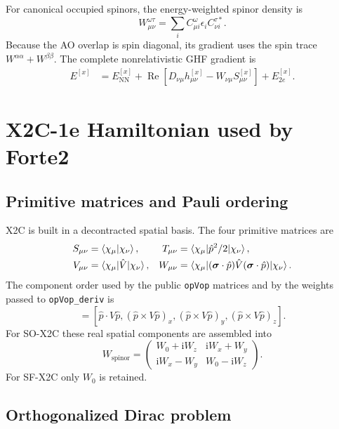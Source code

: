 \documentclass[aip,jcp,preprint]{revtex4-1}
\newcommand{\RePart}{\operatorname{Re}}
\newcommand{\ii}{\mathrm{i}}
\newcommand{\xcoord}{{[x]}}
\begin{document}
For canonical occupied spinors, the energy-weighted spinor density is
\begin{equation}
 W_{\mu\nu}^{\omega\tau}
 =\sum_i C^\omega_{\mu i}\epsilon_i C^{\tau *}_{\nu i}.
\end{equation}
Because the AO overlap is spin diagonal, its gradient uses the spin trace
$W^{\alpha\alpha}+W^{\beta\beta}$.  The complete nonrelativistic GHF gradient
is
\begin{align}
 E^\xcoord
 &=E_\mathrm{NN}^\xcoord
 +\RePart\left[D_{\nu\mu}h^\xcoord_{\mu\nu}
 -W_{\nu\mu}S^\xcoord_{\mu\nu}\right]
 +E^{\xcoord}_{2e}.
 \label{eq:ghf_total_gradient}
\end{align}

\section{X2C-1e Hamiltonian used by Forte2}

\subsection{Primitive matrices and Pauli ordering}

X2C is built in a decontracted spatial basis.  The four primitive matrices are
\begin{align}
 S_{\mu\nu}&=\braket{\chi_\mu|\chi_\nu}, &
 T_{\mu\nu}&=\braket{\chi_\mu|\hat p^2/2|\chi_\nu},\\
 V_{\mu\nu}&=\braket{\chi_\mu|\hat V|\chi_\nu}, &
 W_{\mu\nu}&=\braket{\chi_\mu|(\boldsymbol\sigma\cdot\hat{p})
 \hat V(\boldsymbol\sigma\cdot\hat{p})|\chi_\nu}.
\end{align}
The component order used by the public \texttt{opVop} matrices and by the
weights passed to \texttt{opVop\_deriv} is
\begin{equation}
 [W_0,W_x,W_y,W_z]
 =[\hat p\cdot V\hat p,
   (\hat p\times V\hat p)_x,
   (\hat p\times V\hat p)_y,
   (\hat p\times V\hat p)_z].
 \label{eq:opvop_order}
\end{equation}
For SO-X2C these real spatial components are assembled into
\begin{equation}
 W_\mathrm{spinor}=
 \begin{pmatrix}
 W_0+\ii W_z & \ii W_x+W_y\\
 \ii W_x-W_y & W_0-\ii W_z
 \end{pmatrix}.
 \label{eq:pauli_w}
\end{equation}
For SF-X2C only $W_0$ is retained.

\subsection{Orthogonalized Dirac problem}
\end{document}

